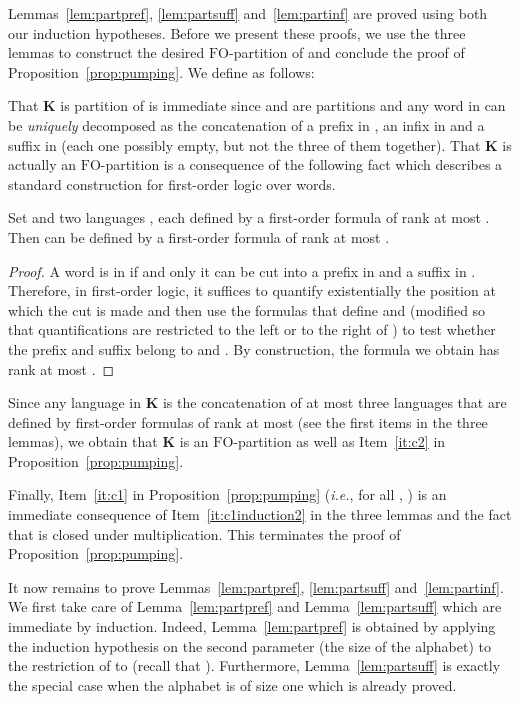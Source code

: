 \documentclass{CSML}
\newcommand\Kb{\ensuremath{\mathbf{K}}\xspace}
\newcommand{\fo}{\ensuremath{\text{FO}}\xspace}
\theoremstyle{plain}
\begin{document}
Lemmas~\ref{lem:partpref}, \ref{lem:partsuff} and~\ref{lem:partinf}
are proved using both our induction hypotheses. Before we present
these proofs, we use the three lemmas to construct the desired
\fo-partition  of  and conclude the proof of
Proposition~\ref{prop:pumping}. We define  as follows:

That \Kb is partition of  is immediate since  and 
are partitions and any word in  can be \emph{uniquely} decomposed
as the concatenation of a prefix in , an infix in 
and a suffix in  (each one possibly empty, but not the three of them together). That \Kb is actually
an \fo-partition is a consequence of the following fact which describes
a standard construction for first-order logic over words.

\begin{fact} \label{fct:foconcat}
  Set  and two languages , each defined by a
  first-order formula of rank at most . Then  can be defined
  by a first-order formula of rank at most .
\end{fact}

\begin{proof}
  A word is in  if and only it can be cut into a prefix in 
  and a suffix in . Therefore, in first-order logic, it suffices to
  quantify existentially the position  at which the cut is made and then
  use the formulas that define  and  (modified so that
  quantifications are restricted to the left or to the right of ) to
  test whether the prefix and suffix belong to  and . By
  construction, the formula we obtain has rank at most .
\end{proof}

Since any language in \Kb is the concatenation of at most three
languages that are defined by first-order formulas of rank at most
 (see the first items in the three
lemmas), we obtain that \Kb is an \fo-partition as well as
Item~\ref{it:c2} in Proposition~\ref{prop:pumping}.

Finally, Item~\ref{it:c1} in Proposition~\ref{prop:pumping} (\emph{i.e.}, for
all , ) is an immediate
consequence of Item~\ref{it:c1induction2} in the three lemmas and the
fact that  is closed under multiplication. This terminates
the proof of Proposition~\ref{prop:pumping}.

It now remains to prove Lemmas~\ref{lem:partpref}, \ref{lem:partsuff}
and~\ref{lem:partinf}. We first take care of Lemma~\ref{lem:partpref}
and Lemma~\ref{lem:partsuff} which are immediate by induction. Indeed,
Lemma~\ref{lem:partpref} is obtained by applying the induction hypothesis
on the second parameter (the size of the alphabet) to the restriction
of  to  (recall that ). Furthermore,
Lemma~\ref{lem:partsuff} is exactly the special case when the alphabet
is of size one which is already proved.
\medskip
\end{document}
